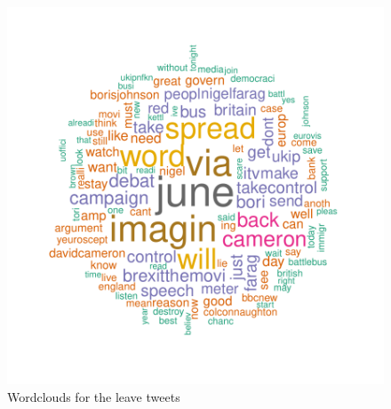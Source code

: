 \documentclass[10pt]{article}
\begin{document}
\begin{figure}[H]
\begin{center}
\begin{Schunk}
\end{Schunk}
\includegraphics{submission-023}
\caption {Wordclouds for the leave tweets}
\label{fig11}
\end {center}
\end {figure}
\end{document}
